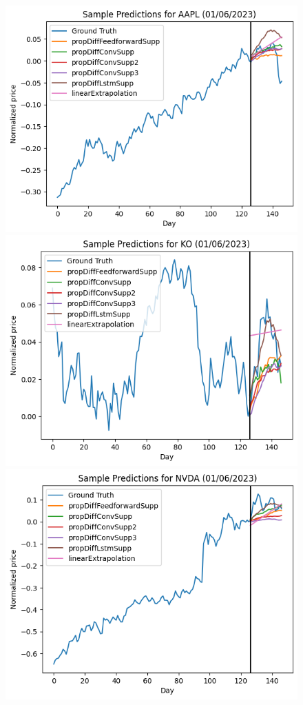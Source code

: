 \documentclass[conference]{IEEEtran}
\begin{document}
\begin{figure}
    \centering
    \includegraphics[width=\columnwidth]{figures/aaplSample.png}
    \includegraphics[width=\columnwidth]{figures/koSample.png}\\
    \includegraphics[width=\columnwidth]{figures/nvdaSample.png}

\end{figure}
\end{document}
